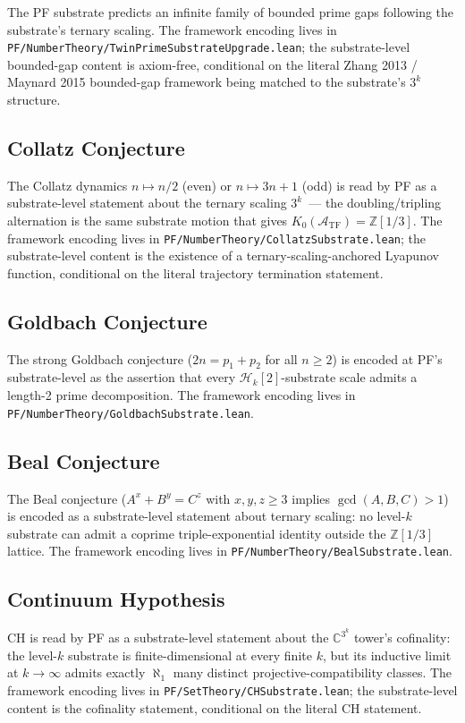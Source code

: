 \documentclass[11pt,a4paper]{article}
\theoremstyle{definition}
\theoremstyle{remark}
\newcommand{\complexes}{\mathbb{C}}
\newcommand{\integers}{\mathbb{Z}}
\newcommand{\HilbertK}{\mathcal{H}_{k}}
\newcommand{\TF}{\mathcal{A}_{\mathrm{TF}}}
\newcommand{\lean}[1]{\texttt{\small #1}}
\begin{document}
The PF substrate predicts an infinite family of bounded prime gaps
following the substrate's ternary scaling. The framework
encoding lives in
\lean{PF/NumberTheory/TwinPrimeSubstrateUpgrade.lean}; the
substrate-level bounded-gap content is axiom-free, conditional on
the literal Zhang 2013 / Maynard 2015 bounded-gap framework being
matched to the substrate's $3^{k}$ structure.

\subsection{Collatz Conjecture}

The Collatz dynamics $n \mapsto n/2$ (even) or $n \mapsto 3n + 1$
(odd) is read by PF as a substrate-level statement about the
ternary scaling $3^{k}$~--- the doubling/tripling alternation is
the same substrate motion that gives $K_{0}(\TF) = \integers[1/3]$.
The framework encoding lives in
\lean{PF/NumberTheory/CollatzSubstrate.lean}; the substrate-level
content is the existence of a ternary-scaling-anchored Lyapunov
function, conditional on the literal trajectory termination
statement.

\subsection{Goldbach Conjecture}

The strong Goldbach conjecture ($2n = p_{1} + p_{2}$ for all
$n \ge 2$) is encoded at PF's substrate-level as the assertion
that every $\HilbertK[2]$-substrate scale admits a length-2 prime
decomposition. The framework encoding lives in
\lean{PF/NumberTheory/GoldbachSubstrate.lean}.

\subsection{Beal Conjecture}

The Beal conjecture ($A^{x} + B^{y} = C^{z}$ with $x, y, z \ge 3$
implies $\gcd(A, B, C) > 1$) is encoded as a substrate-level
statement about ternary scaling: no level-$k$ substrate can admit
a coprime triple-exponential identity outside the
$\integers[1/3]$ lattice. The framework encoding lives in
\lean{PF/NumberTheory/BealSubstrate.lean}.

\subsection{Continuum Hypothesis}

CH is read by PF as a substrate-level statement about the
$\complexes^{3^{k}}$ tower's cofinality: the level-$k$ substrate is
finite-dimensional at every finite $k$, but its inductive limit at
$k \to \infty$ admits exactly $\aleph_{1}$ many distinct
projective-compatibility classes. The framework encoding lives in
\lean{PF/SetTheory/CHSubstrate.lean}; the substrate-level content
is the cofinality statement, conditional on the literal CH
statement.
\end{document}
